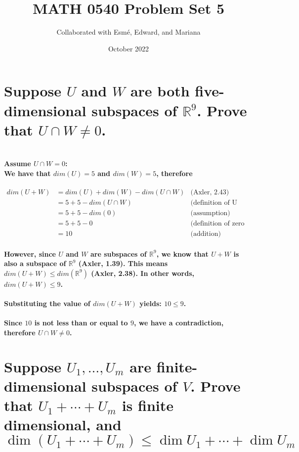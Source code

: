 \documentclass{article}
\title{MATH 0540 Problem Set 5}
\author{Collaborated with Esmé, Edward, and Mariana}
\date{October 2022}
\begin{document}
\maketitle

\section{Suppose $U$ and $W$ are both five-dimensional subspaces of $\mathbb{R}^9$. Prove that $U \cap W \not = 0$.}

\paragraph{\large
\\Assume $U \cap W = 0$:
\\ We have that $dim(U) = 5$ and $dim(W) = 5$, therefore}

\begin{align*}
    dim(U + W) &= dim(U) + dim(W) - dim(U \cap W) & \text{(Axler, 2.43)}\\
    &= 5 + 5 - dim(U \cap W) & \text{(definition of U and W)}\\
    &= 5 + 5 - dim(0) & \text{(assumption)}\\
    &= 5 + 5 - 0 & \text{(definition of zero vector space)}\\
    &= 10 & \text{(addition)}
\end{align*}

\paragraph{\large
However, since $U$ and $W$ are subspaces of $\mathbb{R}^9$, we know that $U + W$ is also a subspace of $\mathbb{R}^9$ (Axler, 1.39). This means $dim(U + W) \leq dim(\mathbb{R}^9)$ (Axler, 2.38). In other words, $dim(U + W) \leq 9$.}

\paragraph{\large
Substituting the value of $dim(U + W)$ yields:
$10 \leq 9$.}

\paragraph{\large
Since $10$ is not less than or equal to $9$, we have a contradiction, therefore $U \cap W \neq 0$.}

\newpage

\section{Suppose $U_1, \ldots, U_m$ are finite-dimensional subspaces of $V$. Prove that $U_1 + \cdots + U_m$ is finite dimensional, and
$$
\dim(U_1 + \cdots + U_m) \leq \dim U_1 + \cdots + \dim U_m
$$}
\end{document}
